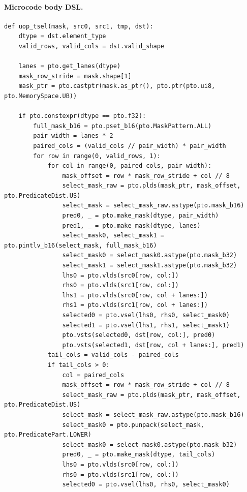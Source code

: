 \paragraph{Microcode body DSL.}
\begin{lstlisting}[style=ptocode]
def uop_tsel(mask, src0, src1, tmp, dst):
    dtype = dst.element_type
    valid_rows, valid_cols = dst.valid_shape

    lanes = pto.get_lanes(dtype)
    mask_row_stride = mask.shape[1]
    mask_ptr = pto.castptr(mask.as_ptr(), pto.ptr(pto.ui8, pto.MemorySpace.UB))

    if pto.constexpr(dtype == pto.f32):
        full_mask_b16 = pto.pset_b16(pto.MaskPattern.ALL)
        pair_width = lanes * 2
        paired_cols = (valid_cols // pair_width) * pair_width
        for row in range(0, valid_rows, 1):
            for col in range(0, paired_cols, pair_width):
                mask_offset = row * mask_row_stride + col // 8
                select_mask_raw = pto.plds(mask_ptr, mask_offset, pto.PredicateDist.US)
                select_mask = select_mask_raw.astype(pto.mask_b16)
                pred0, _ = pto.make_mask(dtype, pair_width)
                pred1, _ = pto.make_mask(dtype, lanes)
                select_mask0, select_mask1 = pto.pintlv_b16(select_mask, full_mask_b16)
                select_mask0 = select_mask0.astype(pto.mask_b32)
                select_mask1 = select_mask1.astype(pto.mask_b32)
                lhs0 = pto.vlds(src0[row, col:])
                rhs0 = pto.vlds(src1[row, col:])
                lhs1 = pto.vlds(src0[row, col + lanes:])
                rhs1 = pto.vlds(src1[row, col + lanes:])
                selected0 = pto.vsel(lhs0, rhs0, select_mask0)
                selected1 = pto.vsel(lhs1, rhs1, select_mask1)
                pto.vsts(selected0, dst[row, col:], pred0)
                pto.vsts(selected1, dst[row, col + lanes:], pred1)
            tail_cols = valid_cols - paired_cols
            if tail_cols > 0:
                col = paired_cols
                mask_offset = row * mask_row_stride + col // 8
                select_mask_raw = pto.plds(mask_ptr, mask_offset, pto.PredicateDist.US)
                select_mask = select_mask_raw.astype(pto.mask_b16)
                select_mask0 = pto.punpack(select_mask, pto.PredicatePart.LOWER)
                select_mask0 = select_mask0.astype(pto.mask_b32)
                pred0, _ = pto.make_mask(dtype, tail_cols)
                lhs0 = pto.vlds(src0[row, col:])
                rhs0 = pto.vlds(src1[row, col:])
                selected0 = pto.vsel(lhs0, rhs0, select_mask0)

\end{lstlisting}
